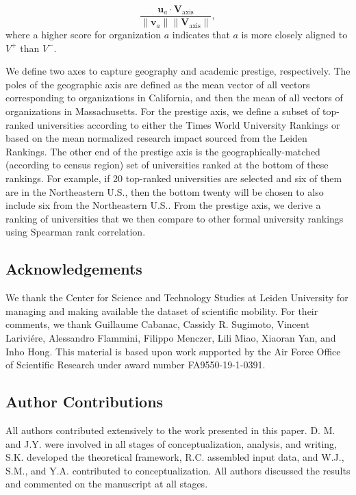 \documentclass[12pt]{article} %
\begin{document}
\begin{equation}
\frac{\bm{u}_{a} \cdot \bm{V}_{\text{axis}}}{\lVert \bm{v}_{a} \rVert \lVert \bm{V}_{\text{axis}} \rVert},
\end{equation}
where a higher score for organization $a$ indicates that $a$ is more closely aligned to $V^+$ than $V^-$.

We define two axes to capture geography and academic prestige, respectively.
The poles of the geographic axis are defined as the mean vector of all vectors corresponding to organizations in California, and then the mean of all vectors of organizations in Massachusetts.
For the prestige axis, we define a subset of top-ranked universities according to either the Times World University Rankings or based on the mean normalized research impact sourced from the Leiden Rankings.
The other end of the prestige axis is the geographically-matched (according to census region) set of universities ranked at the bottom of these rankings.
For example, if 20 top-ranked universities are selected and six of them are in the Northeastern U.S., then the bottom twenty will be chosen to also include six from the Northeastern U.S..
From the prestige axis, we derive a ranking of universities that we then compare to other formal university rankings using Spearman rank correlation.


%
%
\subsection*{Acknowledgements}
We thank the Center for Science and Technology Studies at Leiden University for managing and making available the dataset of scientific mobility. 
For their comments, we thank Guillaume Cabanac, Cassidy R. Sugimoto, Vincent Lariviére, Alessandro Flammini, Filippo Menczer, Lili Miao, Xiaoran Yan, and Inho Hong. 
This material is based upon work supported by the Air Force Office of Scientific Research under award number FA9550-19-1-0391.


%
% 
\subsection*{Author Contributions}
All authors contributed extensively to the work presented in this paper. 
D. M. and J.Y. were involved in all stages of conceptualization, analysis, and writing, S.K. developed the theoretical framework, R.C. assembled input data, and W.J., S.M., and Y.A. contributed to conceptualization. 
All authors discussed the results and commented on the manuscript at all stages.
\end{document}
